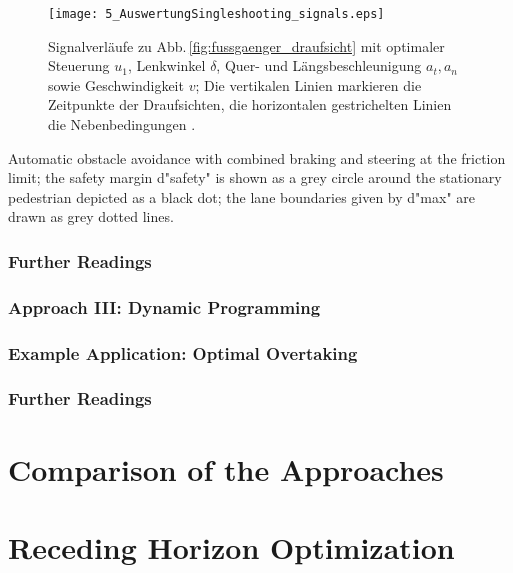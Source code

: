 \begin{figure}	
\centering
	\def\xlabel{$t$ in $\unit{s}$}
	\def\ylabelA{$v$ in $\unitfrac{m}{s}$}	
	\def\ylabelB{$\delta$ in $\unit{rad}$}	
	\def\ylabelC{$u_1$ in $\unitfrac{rad}{s}$}
	\def\ylabelD{$a_t$ in $\unitfrac{m}{s^2}$}	
	\def\ylabelE{$a_n$ in $\unitfrac{m}{s^2}$}
	
	\renewcommand{\matlabtextA}{\normalsize }
  \texttt{[image: 5\_AuswertungSingleshooting\_signals.eps]}
    \caption[Signalverläufe bei kombiniertem Bremsen und Ausweichen]{Signalverläufe zu Abb.\,\ref{fig:fussgaenger_draufsicht} mit optimaler Steuerung $u_1$, Lenkwinkel $\delta$,  Quer- und Längsbeschleunigung $a_t, a_n$ sowie Geschwindigkeit $v$; Die vertikalen Linien markieren die Zeitpunkte der Draufsichten, die horizontalen gestrichelten Linien die Nebenbedingungen \cite{werling2012cdc}.}
    \label{fig:fussgaenger_draufsicht_signale}
\end{figure}
	


Automatic obstacle avoidance with combined braking and steering at the friction limit; the safety margin d"safety"  is shown as a grey circle around the stationary pedestrian depicted as a black dot; the lane boundaries given by d"max"  are drawn as grey dotted lines.

\subsubsection{Further Readings}

\subsubsection{Approach III: Dynamic Programming}

\subsubsection{Example Application: Optimal Overtaking}

\subsubsection{Further Readings}


\section{Comparison of the Approaches}

\section{Receding Horizon Optimization}\label{S:xx}

